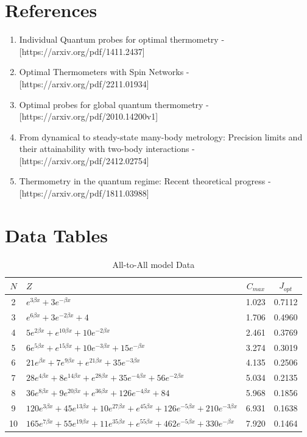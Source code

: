 \documentclass{article}
\begin{document}
\section{References}
\begin{enumerate}
    \item \label{Paper1}Individual Quantum probes for optimal thermometry - [https://arxiv.org/pdf/1411.2437]
    \item \label{Paper2}Optimal Thermometers with Spin Networks - [https://arxiv.org/pdf/2211.01934]
    \item \label{Paper3}Optimal probes for global quantum thermometry - [https://arxiv.org/pdf/2010.14200v1]
    \item \label{Thermalization}From dynamical to steady-state many-body metrology: Precision limits and their attainability with two-body interactions - [https://arxiv.org/pdf/2412.02754]
    \item \label{Review}Thermometry in the quantum regime: Recent theoretical progress - [https://arxiv.org/pdf/1811.03988]
\end{enumerate}

\section{Data Tables}
\begin{table}[h]
    \centering
    \caption{All-to-All model Data}
    \begin{tabular}{|c|l|c|c|}
        \hline 
        $N$ & $Z$ & $C_{max}$ & $J_{opt}$ \\
        \hline
        2 & $e^{3 \beta x} + 3 e^{-\beta x}$ & 1.023 & 0.7112 \\
        \hline
        3 & $e^{6 \beta x} +3e^{-2 \beta x} + 4$ & 1.706 & 0.4960 \\
        \hline
        4 & $5 e^{2 \beta x} + e^{10 \beta x} + 10 e^{-2 \beta x}$ & 2.461 & 0.3769 \\
        \hline
        5 & $6 e^{5 \beta x} + e^{15 \beta x} + 10 e^{-3 \beta x} + 15 e^{-\beta x}$ & 3.274 & 0.3019 \\
        \hline
        6 & $21 e^{\beta x} + 7 e^{9\beta x} + e^{21\beta x} + 35 e^{-3\beta x}$ & 4.135 & 0.2506 \\
        \hline
        7 & $28 e^{4\beta x} + 8 e^{14\beta x} + e^{28\beta x} + 35 e^{-4\beta x} + 56 e^{-2\beta x}$ & 5.034 & 0.2135 \\
        \hline
        8 & $36 e^{8 \beta x} + 9 e^{20 \beta x} + e^{36 \beta x}  + 126 e^{-4 \beta x}+ 84$ & 5.968 & 0.1856 \\
        \hline
        9 & $120 e^{3 \beta x} + 45 e^{13 \beta x} + 10 e^{27 \beta x} + e^{45 \beta x} + 126 e^{-5 \beta x} + 210 e^{-3 \beta x}$ & 6.931 & 0.1638 \\
        \hline
        10 & $165 e^{7 \beta x} + 55 e^{19 \beta x} + 11 e^{35 \beta x} + e^{55 \beta x} + 462 e^{-5 \beta x} + 330 e^{-\beta x} $ & 7.920 & 0.1464 \\
        \hline
    \end{tabular}
    \label{All-To-All Data}
\end{table}
\end{document}
